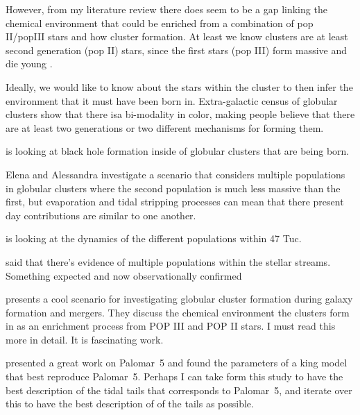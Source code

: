         However, from my literature review there does seem to be a gap linking the chemical environment that could be enriched from a combination of pop II/popIII stars and how cluster formation. At least we know clusters are at least second generation (pop II) stars, since the first stars (pop III) form massive and die young \citep{2002ApJ...571...30S}.

        Ideally, we would like to know about the stars within the cluster to then infer the environment that it must have been born in. Extra-galactic census of globular clusters show that there isa bi-modality in color, making people believe that there are at least two generations or two different mechanisms for forming them. 

        \citet{2025arXiv250507491V} is looking at black hole formation inside of globular clusters that are being born. 

        \citet{2024A&A...681A..45L} Elena and Alessandra investigate a scenario that considers multiple populations in globular clusters where the second population is much less massive than the first, but evaporation and tidal stripping processes can mean that there present day contributions are similar to one another. 

        \citet{2025MNRAS.537.2342C} is looking at the dynamics of the different populations within 47 Tuc.

        \citet{2024MNRAS.529.2413U} said that there's evidence of multiple populations within the stellar streams. Something expected and now observationally confirmed     

        \citet{2025MNRAS.540.1235C} presents a cool scenario for investigating globular cluster formation during galaxy formation and mergers. They discuss the chemical environment the clusters form in as an enrichment process from POP III and POP II stars. I must read this more in detail. It is fascinating work. 

        \citet{2004AJ....127.2753D} presented a great work on Palomar~5 and found the parameters of a king model that best reproduce Palomar~5. Perhaps I can take form this study to have the best description of the tidal tails that corresponds to Palomar~5, and iterate over this to have the best description of of the tails as possible. 










